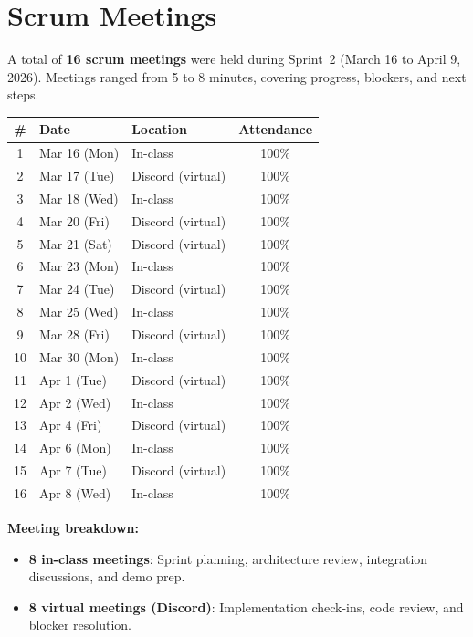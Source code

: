\documentclass[11pt]{article}
\begin{document}
\section{Scrum Meetings}

A total of \textbf{16 scrum meetings} were held during Sprint~2 (March 16 to April 9, 2026). Meetings ranged from 5 to 8 minutes, covering progress, blockers, and next steps.

\begin{center}
\begin{tabularx}{\textwidth}{@{}clXc@{}}
\toprule
\textbf{\#} & \textbf{Date} & \textbf{Location} & \textbf{Attendance} \\
\midrule
1  & Mar 16 (Mon) & In-class           & 100\% \\
2  & Mar 17 (Tue) & Discord (virtual)  & 100\% \\
3  & Mar 18 (Wed) & In-class           & 100\% \\
4  & Mar 20 (Fri) & Discord (virtual)  & 100\% \\
5  & Mar 21 (Sat) & Discord (virtual)  & 100\% \\
6  & Mar 23 (Mon) & In-class           & 100\% \\
7  & Mar 24 (Tue) & Discord (virtual)  & 100\% \\
8  & Mar 25 (Wed) & In-class           & 100\% \\
9  & Mar 28 (Fri) & Discord (virtual)  & 100\% \\
10 & Mar 30 (Mon) & In-class           & 100\% \\
11 & Apr 1 (Tue)  & Discord (virtual)  & 100\% \\
12 & Apr 2 (Wed)  & In-class           & 100\% \\
13 & Apr 4 (Fri)  & Discord (virtual)  & 100\% \\
14 & Apr 6 (Mon)  & In-class           & 100\% \\
15 & Apr 7 (Tue)  & Discord (virtual)  & 100\% \\
16 & Apr 8 (Wed)  & In-class           & 100\% \\
\bottomrule
\end{tabularx}
\end{center}

\textbf{Meeting breakdown:}
\begin{itemize}[leftmargin=1.5em]
    \item \textbf{8 in-class meetings}: Sprint planning, architecture review, integration discussions, and demo prep.
    \item \textbf{8 virtual meetings (Discord)}: Implementation check-ins, code review, and blocker resolution.
\end{itemize}
\end{document}
